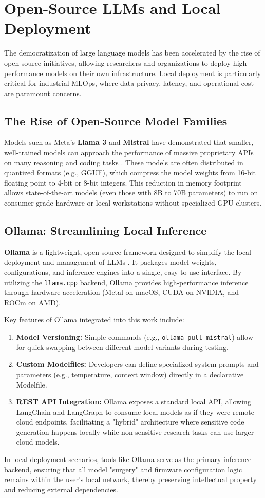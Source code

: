 \section{Open-Source LLMs and Local Deployment}
The democratization of large language models has been accelerated by the rise of open-source initiatives, allowing researchers and organizations to deploy high-performance models on their own infrastructure. Local deployment is particularly critical for industrial MLOps, where data privacy, latency, and operational cost are paramount concerns.

\subsection{The Rise of Open-Source Model Families}
Models such as Meta’s \textbf{Llama 3} and \textbf{Mistral} have demonstrated that smaller, well-trained models can approach the performance of massive proprietary APIs on many reasoning and coding tasks \cite{mistral_7b, touvron2023llama}. These models are often distributed in quantized formats (e.g., GGUF), which compress the model weights from 16-bit floating point to 4-bit or 8-bit integers. This reduction in memory footprint allows state-of-the-art models (even those with 8B to 70B parameters) to run on consumer-grade hardware or local workstations without specialized GPU clusters.

\subsection{Ollama: Streamlining Local Inference}
\textbf{Ollama} is a lightweight, open-source framework designed to simplify the local deployment and management of LLMs \cite{ollama_github_repo}. It packages model weights, configurations, and inference engines into a single, easy-to-use interface. By utilizing the \texttt{llama.cpp} backend, Ollama provides high-performance inference through hardware acceleration (Metal on macOS, CUDA on NVIDIA, and ROCm on AMD).

Key features of Ollama integrated into this work include:
\begin{enumerate}
    \item \textbf{Model Versioning:} Simple commands (e.g., \texttt{ollama pull mistral}) allow for quick swapping between different model variants during testing.
    \item \textbf{Custom Modelfiles:} Developers can define specialized system prompts and parameters (e.g., temperature, context window) directly in a declarative Modelfile.
    \item \textbf{REST API Integration:} Ollama exposes a standard local API, allowing LangChain and LangGraph to consume local models as if they were remote cloud endpoints, facilitating a "hybrid" architecture where sensitive code generation happens locally while non-sensitive research tasks can use larger cloud models.
\end{enumerate}
In local deployment scenarios, tools like Ollama serve as the primary inference backend, ensuring that all model "surgery" and firmware configuration logic remains within the user's local network, thereby preserving intellectual property and reducing external dependencies.
